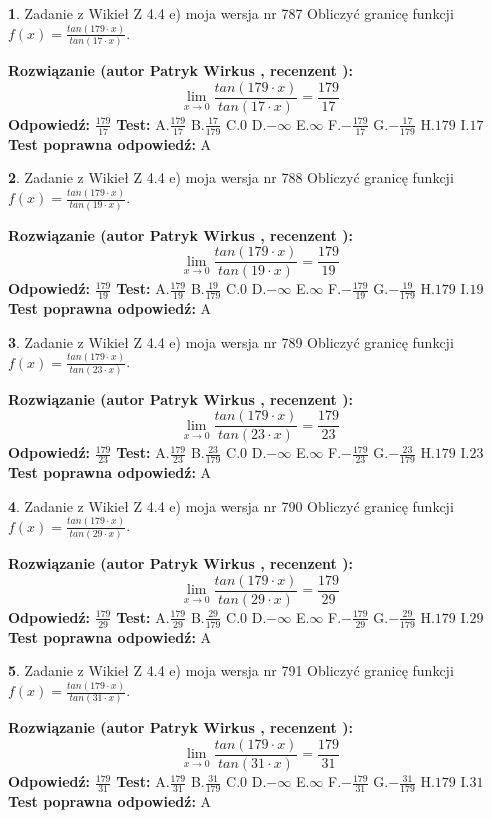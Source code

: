 \documentclass[12pt, a4paper]{article}
\theoremstyle{definition} %
\newtheorem{zad}{}
\newcommand{\zadStart}[1]{\begin{zad}#1\newline}
\newcommand{\zadStop}{\end{zad}}
\newcommand{\rozwStart}[2]{\noindent \textbf{Rozwiązanie (autor #1 , recenzent #2): }\newline}
\newcommand{\rozwStop}{\newline}
\newcommand{\odpStart}{\noindent \textbf{Odpowiedź:}\newline}
\newcommand{\odpStop}{\newline}
\newcommand{\testStart}{\noindent \textbf{Test:}\newline}
\newcommand{\testStop}{\newline}
\newcommand{\kluczStart}{\noindent \textbf{Test poprawna odpowiedź:}\newline}
\newcommand{\kluczStop}{\newline}
\begin{document}
\zadStart{Zadanie z Wikieł Z 4.4 e) moja wersja nr 787}
Obliczyć granicę funkcji $f(x)=\frac{tan(179\cdot x)}{tan(17\cdot x)}$.
\zadStop
\rozwStart{Patryk Wirkus}{}
$$\lim\limits_{x\to 0}\frac{tan(179\cdot x)}{tan(17\cdot x)}=
\frac{179}{17}$$
\rozwStop
\odpStart
$\frac{179}{17}$
\odpStop
\testStart
A.$\frac{179}{17}$
B.$\frac{17}{179}$
C.$0$
D.$-\infty$
E.$\infty$
F.$-\frac{179}{17}$
G.$-\frac{17}{179}$
H.$179$
I.$17$
\testStop
\kluczStart
A
\kluczStop



\zadStart{Zadanie z Wikieł Z 4.4 e) moja wersja nr 788}
Obliczyć granicę funkcji $f(x)=\frac{tan(179\cdot x)}{tan(19\cdot x)}$.
\zadStop
\rozwStart{Patryk Wirkus}{}
$$\lim\limits_{x\to 0}\frac{tan(179\cdot x)}{tan(19\cdot x)}=
\frac{179}{19}$$
\rozwStop
\odpStart
$\frac{179}{19}$
\odpStop
\testStart
A.$\frac{179}{19}$
B.$\frac{19}{179}$
C.$0$
D.$-\infty$
E.$\infty$
F.$-\frac{179}{19}$
G.$-\frac{19}{179}$
H.$179$
I.$19$
\testStop
\kluczStart
A
\kluczStop



\zadStart{Zadanie z Wikieł Z 4.4 e) moja wersja nr 789}
Obliczyć granicę funkcji $f(x)=\frac{tan(179\cdot x)}{tan(23\cdot x)}$.
\zadStop
\rozwStart{Patryk Wirkus}{}
$$\lim\limits_{x\to 0}\frac{tan(179\cdot x)}{tan(23\cdot x)}=
\frac{179}{23}$$
\rozwStop
\odpStart
$\frac{179}{23}$
\odpStop
\testStart
A.$\frac{179}{23}$
B.$\frac{23}{179}$
C.$0$
D.$-\infty$
E.$\infty$
F.$-\frac{179}{23}$
G.$-\frac{23}{179}$
H.$179$
I.$23$
\testStop
\kluczStart
A
\kluczStop



\zadStart{Zadanie z Wikieł Z 4.4 e) moja wersja nr 790}
Obliczyć granicę funkcji $f(x)=\frac{tan(179\cdot x)}{tan(29\cdot x)}$.
\zadStop
\rozwStart{Patryk Wirkus}{}
$$\lim\limits_{x\to 0}\frac{tan(179\cdot x)}{tan(29\cdot x)}=
\frac{179}{29}$$
\rozwStop
\odpStart
$\frac{179}{29}$
\odpStop
\testStart
A.$\frac{179}{29}$
B.$\frac{29}{179}$
C.$0$
D.$-\infty$
E.$\infty$
F.$-\frac{179}{29}$
G.$-\frac{29}{179}$
H.$179$
I.$29$
\testStop
\kluczStart
A
\kluczStop



\zadStart{Zadanie z Wikieł Z 4.4 e) moja wersja nr 791}
Obliczyć granicę funkcji $f(x)=\frac{tan(179\cdot x)}{tan(31\cdot x)}$.
\zadStop
\rozwStart{Patryk Wirkus}{}
$$\lim\limits_{x\to 0}\frac{tan(179\cdot x)}{tan(31\cdot x)}=
\frac{179}{31}$$
\rozwStop
\odpStart
$\frac{179}{31}$
\odpStop
\testStart
A.$\frac{179}{31}$
B.$\frac{31}{179}$
C.$0$
D.$-\infty$
E.$\infty$
F.$-\frac{179}{31}$
G.$-\frac{31}{179}$
H.$179$
I.$31$
\testStop
\kluczStart
A
\kluczStop
\end{document}
